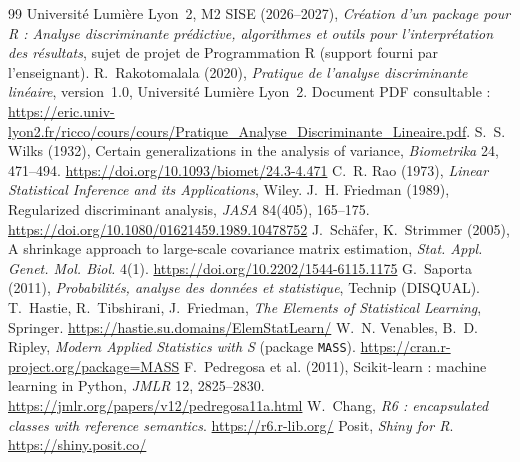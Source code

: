 \documentclass[10.5pt,a4paper]{article}
\newcommand{\code}[1]{\texttt{#1}}
\begin{document}
\clearpage
{}
\begin{thebibliography}{99}\small
{} Universit\'e Lumi\`ere Lyon~2, M2 SISE (2026--2027), \emph{Cr\'eation d'un package pour R : Analyse discriminante pr\'edictive, algorithmes et outils pour l'interpr\'etation des r\'esultats}, sujet de projet de Programmation R (support fourni par l'enseignant).
 R.~Rakotomalala (2020), \emph{Pratique de l'analyse discriminante lin\'eaire}, version~1.0, Universit\'e Lumi\`ere Lyon~2. Document PDF consultable : \url{https://eric.univ-lyon2.fr/ricco/cours/cours/Pratique_Analyse_Discriminante_Lineaire.pdf}.
 S.~S. Wilks (1932), Certain generalizations in the analysis of variance, \emph{Biometrika} 24, 471--494. \url{https://doi.org/10.1093/biomet/24.3-4.471}
 C.~R. Rao (1973), \emph{Linear Statistical Inference and its Applications}, Wiley.
 J.~H. Friedman (1989), Regularized discriminant analysis, \emph{JASA} 84(405), 165--175. \url{https://doi.org/10.1080/01621459.1989.10478752}
 J.~Sch\"afer, K.~Strimmer (2005), A shrinkage approach to large-scale covariance matrix estimation, \emph{Stat. Appl. Genet. Mol. Biol.} 4(1). \url{https://doi.org/10.2202/1544-6115.1175}
 G.~Saporta (2011), \emph{Probabilit\'es, analyse des donn\'ees et statistique}, Technip (DISQUAL).
 T.~Hastie, R.~Tibshirani, J.~Friedman, \emph{The Elements of Statistical Learning}, Springer. \url{https://hastie.su.domains/ElemStatLearn/}
 W.~N. Venables, B.~D. Ripley, \emph{Modern Applied Statistics with S} (package \code{MASS}). \url{https://cran.r-project.org/package=MASS}
 F.~Pedregosa et al. (2011), Scikit-learn : machine learning in Python, \emph{JMLR} 12, 2825--2830. \url{https://jmlr.org/papers/v12/pedregosa11a.html}
 W.~Chang, \emph{R6 : encapsulated classes with reference semantics}. \url{https://r6.r-lib.org/}
 Posit, \emph{Shiny for R}. \url{https://shiny.posit.co/}
\end{thebibliography}
\end{document}
